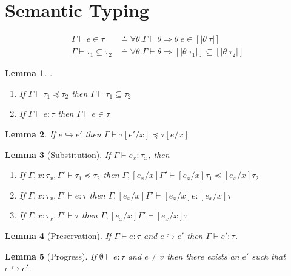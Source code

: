 \documentclass[10pt,a4paper]{article}
\newtheorem{lemma}{Lemma}
\newcommand\sub[2]{\ensuremath{\left[ #2 / #1 \right]}}
\newcommand\interp[1]{\ensuremath{[|#1|]}}
\newcommand\eval[2]{\ensuremath{#1 \hookrightarrow #2}}
\newcommand\hastype[3]{\ensuremath{#1 \vdash #2 \colon #3}}
\newcommand\shastype[3]{\ensuremath{#1 \vdash #2 \in #3}}
\newcommand\iswellformed[2]{\ensuremath{#1 \vdash #2}}
\newcommand\issubtype[3]{\ensuremath{#1 \vdash #2 \preceq #3}}
\newcommand\sissubtype[3]{\ensuremath{#1 \vdash #2 \subseteq #3}}
\begin{document}
\section*{Semantic Typing}
\begin{align*}
\shastype{\Gamma}{e}{\tau} & \doteq
	\forall \theta . \iswellformed{\Gamma}{\theta} \Rightarrow \theta\ e \in \interp{\theta \ \tau}\\
\sissubtype{\Gamma}{\tau_1}{\tau_2} & \doteq 
	\forall \theta . \iswellformed{\Gamma}{\theta} \Rightarrow \interp{\theta\ \tau_1} \subseteq \interp{\theta\ \tau_2}
\end{align*}


\begin{lemma}.
\begin{enumerate}
\item If \issubtype{\Gamma}{\tau_1}{\tau_2} then \sissubtype{\Gamma}{\tau_1}{\tau_2} 
\item If \hastype{\Gamma}{e}{\tau} then \shastype{\Gamma}{e}{\tau} 
\end{enumerate}
\end{lemma}

\begin{lemma}
If \eval{e}{e'} then \issubtype{\Gamma}{\tau\sub{x}{e'}}{\tau\sub{x}{e}}
\end{lemma}


\begin{lemma}[Substitution]
If \hastype{\Gamma}{e_x}{\tau_x}, then 
\begin{enumerate}
\item If 
	\issubtype{\Gamma, x\colon\tau_x, \Gamma'}{\tau_1}{\tau_2}
	then
	\issubtype{\Gamma, \sub{x}{e_x}\Gamma'}{\sub{x}{e_x}\tau_1}{\sub{x}{e_x}\tau_2}
\item If 
	\hastype{\Gamma, x\colon\tau_x, \Gamma'}{e}{\tau}
	then
	\hastype{\Gamma, \sub{x}{e_x}\Gamma'}{\sub{x}{e_x}e}{\sub{x}{e_x}\tau}
\item If 
	\iswellformed{\Gamma, x\colon\tau_x, \Gamma'}{\tau}
	then
	\iswellformed{\Gamma, \sub{x}{e_x}\Gamma'}{\sub{x}{e_x}\tau}
\end{enumerate}
\end{lemma}


\begin{lemma}[Preservation]
If \hastype{\Gamma}{e}{\tau} and \eval{e}{e'} then \hastype{\Gamma}{e'}{\tau}.
\end{lemma}
\begin{lemma}[Progress]
If \hastype{\emptyset}{e}{\tau} and $e \neq v$ then there exists an $e'$ such that \eval{e}{e'}.
\end{lemma}
\end{document}
